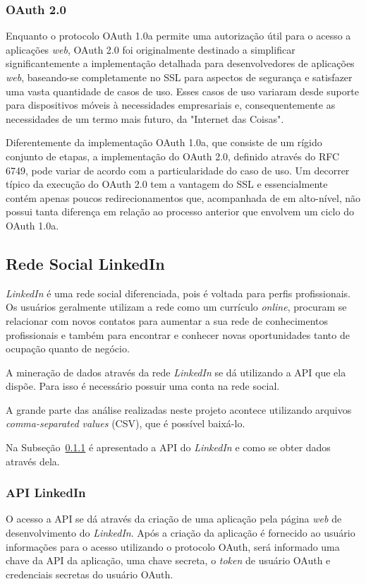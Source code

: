 \subsubsection{\textbf{OAuth 2.0}}
Enquanto o protocolo OAuth 1.0a permite uma autorização útil para o acesso a aplicações \textit{web}, OAuth 2.0 foi originalmente destinado a simplificar significantemente a implementação detalhada para desenvolvedores de aplicações \textit{web}, baseando-se completamente no SSL para aspectos de segurança e satisfazer uma vasta quantidade de casos de uso. Esses casos de uso variaram desde suporte para dispositivos móveis à necessidades empresariais e, consequentemente as necessidades de um termo mais futuro, da "Internet das Coisas"\space \cite{mining-social-web}.

Diferentemente da implementação OAuth 1.0a, que consiste de um rígido conjunto de etapas, a implementação do OAuth 2.0, definido através do RFC 6749, pode variar de acordo com a particularidade do caso de uso. Um decorrer típico da execução do OAuth 2.0 tem a vantagem do SSL e essencialmente contém apenas poucos redirecionamentos que, acompanhada de em alto-nível, não possui tanta diferença em relação ao processo anterior que envolvem um ciclo do OAuth 1.0a.

\subsection{Rede Social LinkedIn}
\textit{LinkedIn} é uma rede social diferenciada, pois é voltada para perfis profissionais. Os usuários geralmente utilizam a rede como um currículo \textit{online}, procuram se relacionar com novos contatos para aumentar a sua rede de conhecimentos profissionais e também para encontrar e conhecer novas oportunidades tanto de ocupação quanto de negócio.

A mineração de dados através da rede \textit{LinkedIn} se dá utilizando a API que ela dispõe. Para isso é necessário possuir uma conta na rede social.

A grande parte das análise realizadas neste projeto acontece utilizando arquivos \textit{comma-separated values} (CSV), que é possível baixá-lo.

Na Subseção~\ref{api-linkedin} é apresentado a API do \textit{LinkedIn} e como se obter dados através dela.

\subsubsection{\textbf{API LinkedIn}}\label{api-linkedin}
O acesso a API se dá através da criação de uma aplicação pela página \textit{web} de desenvolvimento do \textit{LinkedIn}. Após a criação da aplicação é fornecido ao usuário informações para o acesso utilizando o protocolo OAuth, será informado uma chave da API da aplicação, uma chave secreta, o \textit{token} de usuário OAuth e credenciais secretas do usuário OAuth.

